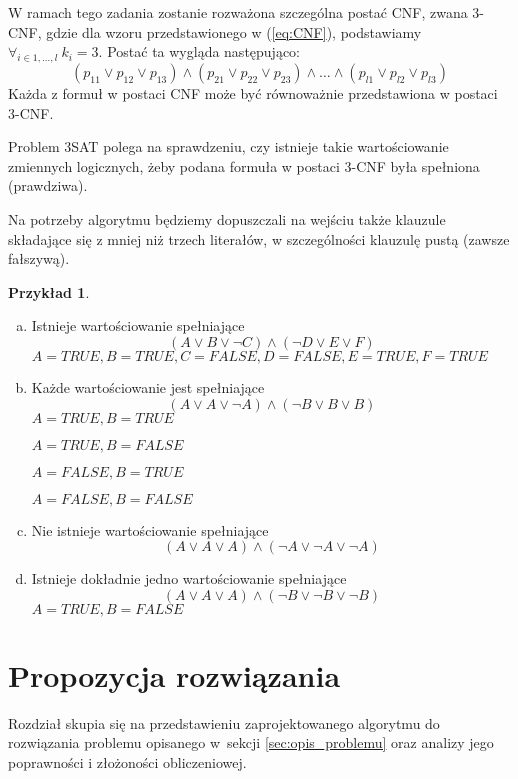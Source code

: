 \documentclass[a4paper,10pt,twoside]{report}
\theoremstyle{definition}
\newtheorem{example}[theorem]{Przykład}
\begin{document}
W ramach tego zadania zostanie rozważona szczególna postać CNF, zwana 3-CNF, gdzie dla wzoru przedstawionego w (\ref{eq:CNF}), podstawiamy $\forall_{i\in {1, \dots , l }}\ k_i = 3$. Postać ta wygląda następująco:
\begin{equation}
\label{eq:3CNF}
(p_{11} \lor p_{12} \lor p_{13})\land (p_{21} \lor p_{22} \lor p_{23})\land\dots\land (p_{l1} \lor p_{l2} \lor p_{l3})
\end{equation}
Każda z formuł w postaci CNF może być równoważnie przedstawiona w postaci 3-CNF.

Problem 3SAT polega na sprawdzeniu, czy istnieje takie wartościowanie zmiennych logicznych, żeby podana formuła w postaci 3-CNF była spełniona (prawdziwa).

Na potrzeby algorytmu będziemy dopuszczali na wejściu także klauzule składające się z mniej niż trzech literałów, w szczególności klauzulę pustą (zawsze fałszywą).

\begin{example} \hfill
\begin{enumerate}[(a)]
    \item Istnieje wartościowanie spełniające
    $$(A\lor B\lor\lnot C)\land (\lnot D\lor E\lor F)$$
    $A=TRUE, B=TRUE, C=FALSE, D=FALSE, E=TRUE, F=TRUE$
    \item Każde wartościowanie jest spełniające
    $$(A\lor A\lor\lnot A)\land (\lnot B\lor B\lor B)$$
    $A=TRUE, B=TRUE$
    
    $A=TRUE, B=FALSE$

    $A=FALSE, B=TRUE$
    
    $A=FALSE, B=FALSE$
    \item Nie istnieje wartościowanie spełniające
    $$(A\lor A\lor A)\land (\lnot A\lor \lnot A\lor \lnot A)$$
    \item Istnieje dokładnie jedno wartościowanie spełniające
    $$(A\lor A\lor A)\land (\lnot B\lor\lnot B\lor\lnot B)$$
    $A=TRUE, B=FALSE$
\end{enumerate}
\end{example}


\chapter{Propozycja rozwiązania}

Rozdział skupia się na przedstawieniu zaprojektowanego algorytmu do rozwiązania problemu opisanego w~sekcji \ref{sec:opis_problemu} oraz analizy jego poprawności i złożoności obliczeniowej.
\end{document}
